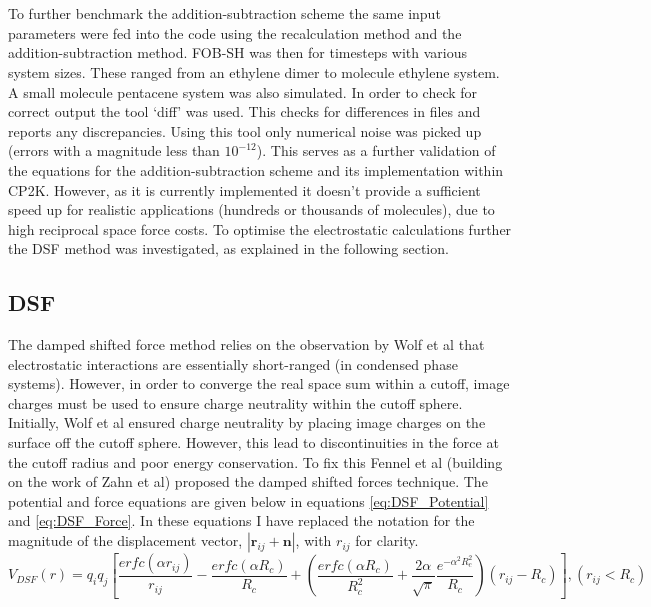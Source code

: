 \\\\
To further benchmark the addition-subtraction scheme the same input parameters were fed into the code using the recalculation method and the addition-subtraction method. FOB-SH was then  for  timesteps with various system sizes. These ranged from an ethylene dimer to  molecule ethylene system. A small  molecule pentacene system was also simulated. In order to check for correct output the tool `diff' was used. This checks for differences in files and reports any discrepancies. Using this tool only numerical noise was picked up (errors with a magnitude less than $10^{-12}$). This serves as a further validation of the equations for the addition-subtraction scheme and its implementation within CP2K.  However, as it is currently implemented it doesn't provide a sufficient speed up for realistic applications (hundreds or thousands of molecules), due to high reciprocal space force costs. To optimise the electrostatic calculations further the DSF \cite{DSF} method was investigated, as explained in the following section.
\subsection{DSF}
The damped shifted force  method relies on the observation by Wolf et al \cite{Wolf99} that electrostatic interactions are essentially short-ranged (in condensed phase systems). However, in order to converge the real space sum within a cutoff, image charges must be used to ensure charge neutrality within the cutoff sphere. Initially, Wolf et al ensured charge neutrality by placing image charges on the surface off the cutoff sphere. However, this lead to discontinuities in the force at the cutoff radius and poor energy conservation. To fix this Fennel et al (building on the work of Zahn et al) proposed the damped shifted forces technique. The potential and force equations are given below in equations \eqref{eq:DSF_Potential} and \eqref{eq:DSF_Force}. In these equations I have replaced the notation for the magnitude of the displacement vector, $|\mathbf{r}_{ij} + \mathbf{n}|$, with $r_{ij}$ for clarity.
\begin{equation}
	V_{DSF}(r) = q_{i} q_{j} \left[ \frac{erfc(\alpha r_{ij})}{r_{ij}}  - \frac{erfc(\alpha R_{c})}{R_{c}} + \left( \frac{erfc(\alpha R_{c})}{R_{c}^2} + \frac{2 \alpha}{\sqrt{\pi}} \frac{e^{-\alpha^2 R_{c}^2}}{R_{c}} \right) (r_{ij} - R_{c}) \right], (r_{ij} < R_{c})
  \label{eq:DSF_Potential}
\end{equation}

